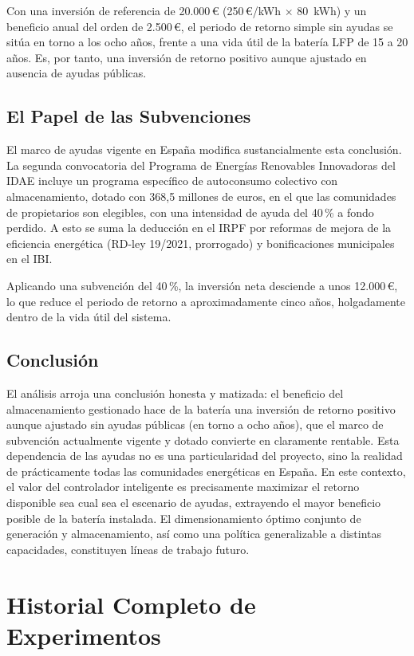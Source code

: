 \documentclass[12pt, a4paper, twoside]{report}
\begin{document}
Con una inversión de referencia de 20.000\,€ (250\,€/kWh
$\times$ \SI{80}{kWh}) y un beneficio anual del orden de 2.500\,€, el periodo
de retorno simple sin ayudas se sitúa en torno a los ocho años, frente a una vida
útil de la batería LFP de 15 a 20 años. Es, por tanto, una inversión de retorno
positivo aunque ajustado en ausencia de ayudas públicas.

\section{El Papel de las Subvenciones}

El marco de ayudas vigente en España modifica sustancialmente esta conclusión.
La segunda convocatoria del Programa de Energías Renovables Innovadoras del IDAE
incluye un programa específico de autoconsumo colectivo con almacenamiento,
dotado con 368,5 millones de euros, en el que las comunidades de propietarios
son elegibles, con una intensidad de ayuda del 40\,\% a fondo perdido. A esto se
suma la deducción en el IRPF por reformas de mejora de la eficiencia energética
(RD-ley 19/2021, prorrogado) y bonificaciones municipales en el IBI.

Aplicando una subvención del 40\,\%, la inversión neta desciende a unos
12.000\,€, lo que reduce el periodo de retorno a aproximadamente cinco años,
holgadamente dentro de la vida útil del sistema.

\section{Conclusión}

El análisis arroja una conclusión honesta y matizada: el beneficio del
almacenamiento gestionado hace de la batería una inversión de retorno positivo
aunque ajustado sin ayudas públicas (en torno a ocho años), que el marco de
subvención actualmente vigente y dotado convierte en claramente rentable. Esta
dependencia de las ayudas no es una particularidad del proyecto, sino la
realidad de prácticamente todas las comunidades energéticas en España. En este
contexto, el valor del controlador inteligente es precisamente maximizar el
retorno disponible sea cual sea el escenario de ayudas, extrayendo el mayor
beneficio posible de la batería instalada. El dimensionamiento óptimo conjunto
de generación y almacenamiento, así como una política generalizable a distintas
capacidades, constituyen líneas de trabajo futuro.

\chapter{Historial Completo de Experimentos}
\label{app:historial}
\end{document}
